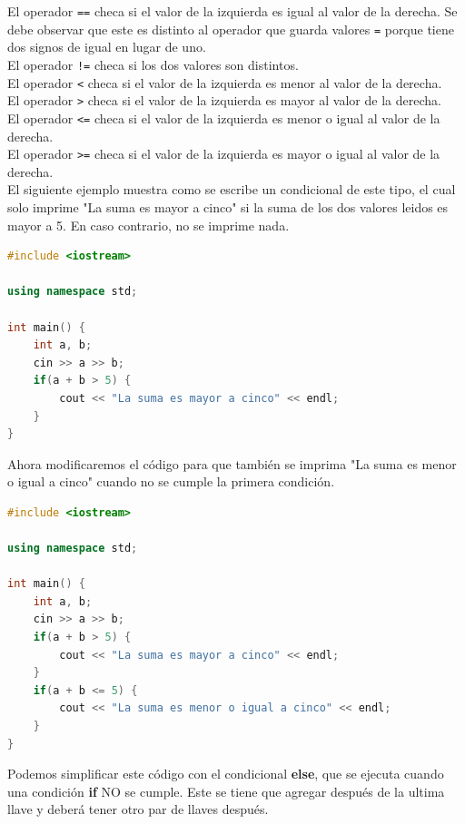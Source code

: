 \documentclass{article}
\begin{document}
El operador \lstinline{==} checa si el valor de la izquierda es igual al valor de la derecha. Se debe observar que este es distinto al operador que guarda valores \lstinline{=} porque tiene dos signos de igual en lugar de uno. \\

El operador \lstinline{!=} checa si los dos valores son distintos. \\

El operador \lstinline{<} checa si el valor de la izquierda es menor al valor de la derecha. \\

El operador \lstinline{>} checa si el valor de la izquierda es mayor al valor de la derecha. \\

El operador \lstinline{<=} checa si el valor de la izquierda es menor o igual al valor de la  derecha. \\

El operador \lstinline{>=} checa si el valor de la izquierda es mayor o igual al valor de la derecha. \\

El siguiente ejemplo muestra como se escribe un condicional de este tipo, el cual solo imprime "La suma es mayor a cinco" si la suma de los dos valores leidos es mayor a 5. En caso contrario, no se imprime nada.

\begin{lstlisting}[language=C++, title=Condiciones]
#include <iostream>

using namespace std;

int main() {
	int a, b;
	cin >> a >> b;
	if(a + b > 5) {
		cout << "La suma es mayor a cinco" << endl;
	}
}
\end{lstlisting}

Ahora modificaremos el código para que también se imprima "La suma es menor o igual a cinco" cuando no se cumple la primera condición.

\begin{lstlisting}[language=C++, title=Condiciones]
#include <iostream>

using namespace std;

int main() {
	int a, b;
	cin >> a >> b;
	if(a + b > 5) {
		cout << "La suma es mayor a cinco" << endl;
	}
	if(a + b <= 5) {
		cout << "La suma es menor o igual a cinco" << endl;
	}
}
\end{lstlisting}

Podemos simplificar este código con el condicional \textbf{else}, que se ejecuta cuando una condición \textbf{if} NO se cumple. Este se tiene que agregar después de la ultima llave y deberá tener otro par de llaves después.
\end{document}

